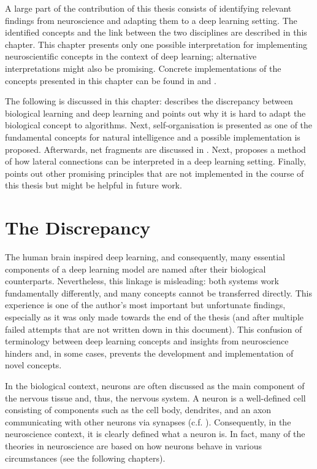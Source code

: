 A large part of the contribution of this thesis consists of identifying relevant findings from neuroscience and adapting them to a deep learning setting.
The identified concepts and the link between the two disciplines are described in this chapter.
This chapter presents only one possible interpretation for implementing neuroscientific concepts in the context of deep learning; alternative interpretations might also be promising.
Concrete implementations of the concepts presented in this chapter can be found in  and .

The following is discussed in this chapter:
 describes the discrepancy between biological learning and deep learning and points out why it is hard to adapt the biological concept to algorithms. Next,  self-organisation is presented as one of the fundamental concepts for natural intelligence and a possible implementation is proposed. Afterwards, net fragments are discussed in . Next,  proposes a method of how lateral connections can be interpreted in a deep learning setting. Finally,  points out other promising principles that are not implemented in the course of this thesis but might be helpful in future work.


\section{The Discrepancy}
The human brain inspired deep learning, and consequently, many essential components of a deep learning model are named after their biological counterparts. Nevertheless, this linkage is misleading: both systems work fundamentally differently, and many concepts cannot be transferred directly.
This experience is one of the author's most important but unfortunate findings, especially as it was only made towards the end of the thesis (and after multiple failed attempts that are not written down in this document). This confusion of terminology between deep learning concepts and insights from neuroscience hinders and, in some cases, prevents the development and implementation of novel concepts. 

In the biological context, neurons are often discussed as the main component of the nervous tissue and, thus, the nervous system.
A neuron is a well-defined cell consisting of components such as the cell body, dendrites, and an axon communicating with other neurons via synapses (c.f. ).
Consequently, in the neuroscience context, it is clearly defined what a neuron is. In fact, many of the theories in neuroscience are based on how neurons behave in various circumstances (see the following chapters). 

